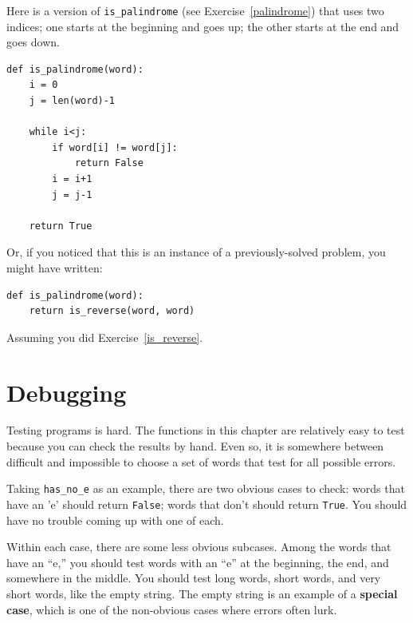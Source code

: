 \documentclass[10pt]{book}
\begin{document}

Here is a version of \verb"is_palindrome" (see
Exercise~\ref{palindrome}) that uses two indices; one starts at the
beginning and goes up; the other starts at the end and goes down.

\beforeverb
\begin{verbatim}
def is_palindrome(word):
    i = 0
    j = len(word)-1

    while i<j:
        if word[i] != word[j]:
            return False
        i = i+1
        j = j-1

    return True
\end{verbatim}
\afterverb

Or, if you noticed that this is an instance of a previously-solved
problem, you might have written:

\beforeverb
\begin{verbatim}
def is_palindrome(word):
    return is_reverse(word, word)
\end{verbatim}
\afterverb


Assuming you did Exercise~\ref{is_reverse}.

\section{Debugging}


Testing programs is hard.  The functions in this chapter are
relatively easy to test because you can check the results by hand.
Even so, it is somewhere between difficult and impossible to choose a
set of words that test for all possible errors.

Taking \verb"has_no_e" as an example, there are two obvious
cases to check: words that have an 'e' should return {\tt False};
words that don't should return {\tt True}.  You should have no
trouble coming up with one of each.

Within each case, there are some less obvious subcases.  Among the
words that have an ``e,'' you should test words with an ``e'' at the
beginning, the end, and somewhere in the middle.  You should test long
words, short words, and very short words, like the empty string.  The
empty string is an example of a {\bf special case}, which is one of
the non-obvious cases where errors often lurk.
\end{document}
